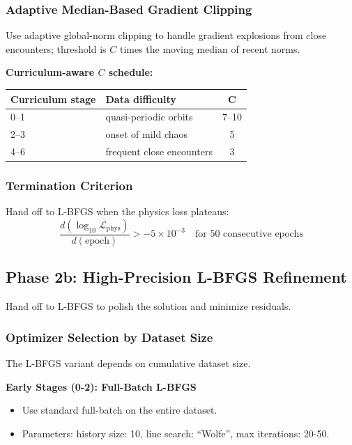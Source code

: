 \documentclass{article}
\begin{document}
\subsubsection{Adaptive Median-Based Gradient Clipping}

Use adaptive global-norm clipping to handle gradient explosions from close encounters; threshold is $C$ times the moving median of recent norms.

\textbf{Curriculum-aware $C$ schedule:}
\begin{table}[H]
    \centering
    \begin{tabular}{|l|l|c|}
    \hline
    \textbf{Curriculum stage} & \textbf{Data difficulty} & \textbf{C} \\
    \hline
    0--1 & quasi-periodic orbits & 7--10 \\
    2--3 & onset of mild chaos & 5 \\
    4--6 & frequent close encounters & 3 \\
    \hline
    \end{tabular}
\end{table}

\subsubsection{Termination Criterion}
Hand off to L-BFGS when the physics loss plateaus:
\begin{equation}
\frac{d(\log_{10} \mathcal{L}_{\text{phys}})}{d(\text{epoch})} > -5 \times 10^{-3} \quad \text{for 50 consecutive epochs}
\end{equation}

\subsection{Phase 2b: High-Precision L-BFGS Refinement}

Hand off to L-BFGS to polish the solution and minimize residuals.

\subsubsection{Optimizer Selection by Dataset Size}
The L-BFGS variant depends on cumulative dataset size.

\textbf{Early Stages (0-2): Full-Batch L-BFGS}
\begin{itemize}
    \item Use standard full-batch on the entire dataset.
    \item Parameters: history size: 10, line search: ``Wolfe'', max iterations: 20-50.
\end{itemize}
\end{document}
